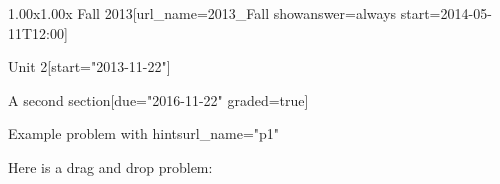 \documentclass[12pt]{article}
\begin{document}
\begin{edXcourse}{1.00x}{1.00x Fall 2013}[url_name=2013_Fall showanswer=always start=2014-05-11T12:00]
\begin{edXchapter}{Unit 2}[start="2013-11-22"]
\begin{edXsection}{A second section}[due="2016-11-22" graded=true]

\begin{edXproblem}{Example problem with hints}{url_name="p1"}
 
Here is a drag and drop problem:


\end{edXproblem}


\end{edXsection}
\end{edXchapter}
\end{edXcourse}

\end{document}
